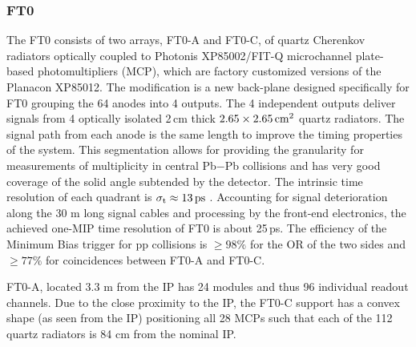  \subsubsection{FT0}
 
The FT0 consists of two
arrays, FT0-A and FT0-C, of  quartz Cherenkov radiators optically coupled to Photonis XP85002/FIT-Q microchannel
plate-based photomultipliers (MCP), which are factory customized versions of the Planacon XP85012. The modification is a new back-plane designed specifically for FT0 grouping the 64 anodes into 4 outputs. The 4 independent outputs deliver signals from 4 optically isolated 2\,cm thick  $2.65\times 2.65 \,\rm{cm}^2$  quartz radiators.  The signal path from each anode is the same length to improve the timing properties of the system.  This segmentation allows for providing the granularity for measurements of  multiplicity in central Pb$-$Pb collisions and has very good coverage of the solid angle subtended by the detector.  The intrinsic time resolution of each quadrant is  $\sigma_{\rm t} \approx 13\, {\rm ps}$ \cite{Melikyan:2020owp}. Accounting for signal deterioration along the 30 m long signal cables and processing by the 
front-end electronics, the achieved one-MIP time resolution of FT0 is about 25\,ps.  
The efficiency of the Minimum Bias trigger for pp collisions is  $\geq 98\%$ for the OR of the two sides and  $\geq 77\%$ for coincidences between FT0-A and FT0-C.


FT0-A, located 3.3 m from the IP has 24 modules and thus 96 individual readout channels.
Due to the close proximity to the IP, the FT0-C support has a convex shape (as seen from the IP) positioning all 28 MCPs such that each of the 112 quartz radiators is 84 cm from the nominal IP.
 
